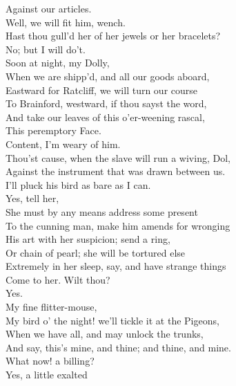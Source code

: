 \documentclass{memoir}
\begin{document}
\begin{drama*}
 Against our articles.\\
\subtlespeaks {} Well, we will fit him, wench.\\
 Hast thou gull'd her of her jewels or her bracelets?\\
\dolspeaks  No; but I will do't.\\
\subtlespeaks {} Soon at night, my Dolly,\\
 When we are shipp'd, and all our goods aboard,\\
 Eastward for Ratcliff, we will turn our course\\
 To Brainford, westward, if thou sayst the word,\\
 And take our leaves of this o'er-weening rascal,\\
 This peremptory Face.\\
\dolspeaks {} Content, I'm weary of him.\\
\subtlespeaks  Thou'st cause, when the slave will run a wiving, Dol,\\
 Against the instrument that was drawn between us.\\
\dolspeaks  I'll pluck his bird as bare as I can.\\
\subtlespeaks {} Yes, tell her,\\
 She must by any means address some present\\
 To the cunning man, make him amends for wronging\\
 His art with her suspicion; send a ring,\\
 Or chain of pearl; she will be tortured else\\
 Extremely in her sleep, say, and have strange things\\
 Come to her. Wilt thou?\\
\dolspeaks {} Yes.\\
\subtlespeaks {} My fine flitter-mouse,\\
 My bird o' the night! we'll tickle it at the Pigeons,\\
 When we have all, and may unlock the trunks,\\
 And say, this's mine, and thine; and thine, and mine.\\
\facespeaks  What now! a billing?\\
\subtlespeaks {} Yes, a little exalted\\

\end{drama*}
\end{document}
